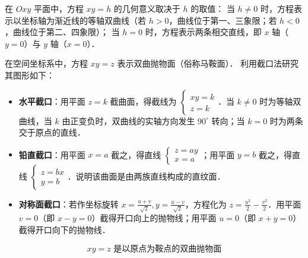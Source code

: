 \begin{solution}

    在 $Oxy$ 平面中，方程 $xy = h$ 的几何意义取决于 $h$ 的取值：
    当 $h \neq 0$ 时，方程表示以坐标轴为渐近线的等轴双曲线（若 $h > 0$，曲线位于第一、三象限；若 $h < 0$，曲线位于第二、四象限）；
    当 $h = 0$ 时，方程表示两条相交直线，即 $x$ 轴（$y = 0$）与 $y$ 轴（$x = 0$）．


    在空间坐标系中，方程 $xy = z$ 表示双曲抛物面（俗称马鞍面）．
    利用截口法研究其图形如下：
    \begin{itemize}
        \item \textbf{水平截口}：用平面 $z = k$ 截曲面，得截线为 $\begin{cases} xy = k \\ z = k \end{cases}$．当 $k \neq 0$ 时为等轴双曲线，当 $k$ 由正变负时，双曲线的实轴方向发生 $90^\circ$ 转向；当 $k = 0$ 时为两条交于原点的直线．
        \item \textbf{铅直截口}：用平面 $x = a$ 截之，得直线 $\begin{cases} z = ay \\ x = a \end{cases}$；用平面 $y = b$ 截之，得直线 $\begin{cases} z = bx \\ y = b \end{cases}$．说明该曲面是由两族直线构成的直纹面．
        \item \textbf{对称面截口}：若作坐标旋转 $x = \frac{u+v}{\sqrt{2}}, y = \frac{u-v}{\sqrt{2}}$，方程化为 $z = \frac{u^2}{2} - \frac{v^2}{2}$．用平面 $v = 0$（即 $x-y=0$）截得开口向上的抛物线；用平面 $u = 0$（即 $x+y=0$）截得开口向下的抛物线．
    \end{itemize}
    \begin{equation}
        \boxed{xy = z \text{ 是以原点为鞍点的双曲抛物面}}
    \end{equation}
\end{solution}

\endinput
